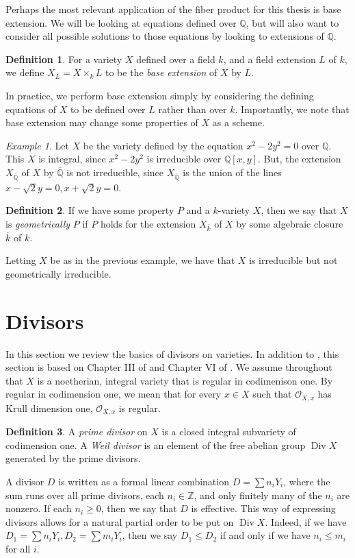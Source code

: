 \documentclass[12pt,twoside]{reedthesis}
\theoremstyle{plain}
\theoremstyle{definition}
\newtheorem{definition}{Definition}[section]
\theoremstyle{remark}
\newtheorem{example}{Example}[section]
\newcommand{\ZZ}{\mathbb{Z}}
\newcommand{\QQ}{\mathbb{Q}}
\newcommand{\calO}{\mathcal{O}}
\newcommand{\Div}{\operatorname{Div}}
\begin{document}
Perhaps the most relevant application of the fiber product for this thesis is base extension. We will be looking at equations defined over $\QQ$, but will also want to consider all possible solutions to those equations by looking to extensions of $\QQ$.
\begin{definition}
For a variety $X$ defined over a field $k$, and a field extension $L$ of $k$, we define $X_L=X\times_k L$ to be the \emph{base extension} of $X$ by $L$.
\end{definition}
\noindent In practice, we perform base extension simply by considering the defining equations of $X$ to be defined over $L$ rather than over $k$. Importantly, we note that base extension may change some properties of $X$ as a scheme.

\begin{example}
Let $X$ be the variety defined by the equation $x^2-2y^2=0$ over $\QQ$. This $X$ is integral, since $x^2-2y^2$ is irreducible over $\QQ[x,y]$. But, the extension $X_{\overline{\QQ}}$ of $X$ by $\overline{\QQ}$ is not irreducible, since $X_{\overline{\QQ}}$ is the union of the lines $x-\sqrt{2}y=0, x+\sqrt{2}y=0$.
\end{example}

\begin{definition}
If we have some property $P$ and a $k$-variety $X$, then we say that $X$ is \emph{geometrically} $P$ if $P$ holds for the extension $X_{\overline{k}}$ of $X$ by some algebraic closure $\overline{k}$ of $k$.
\end{definition}
\noindent Letting $X$ be as in the previous example, we have that $X$ is irreducible but not geometrically irreducible.

\section{Divisors}
In this section we review the basics of divisors on varieties. In addition to \cite{hartshorne}, this section is based on Chapter III of \cite{shafarevichVol1} and Chapter VI of \cite{shafarevichVol2}. We assume throughout that $X$ is a noetherian, integral variety that is regular in codimenison one. By regular in codimension one, we mean that for every $x\in X$ such that $\calO_{X,x}$ has Krull dimension one, $\calO_{X,x}$ is regular.

\begin{definition}
A \emph{prime divisor} on $X$ is a closed integral subvariety of codimension one. A \emph{Weil divisor} is an element of the free abelian group $\Div X$ generated by the prime divisors. 
\end{definition}
A divisor $D$ is written as a formal linear combination $D=\sum n_i Y_i$, where the sum runs over all prime divisors, each $n_i\in\ZZ$, and only finitely many of the $n_i$ are nonzero. If each $n_i\geq 0$, then we say that $D$ is effective. This way of expressing divisors allows for a natural partial order to be put on $\Div X$. Indeed, if we have $D_1=\sum n_i Y_i, D_2=\sum m_i Y_i$, then we say $D_1\leq D_2$ if and only if we have $n_i\leq m_i$ for all $i$.
\end{document}

